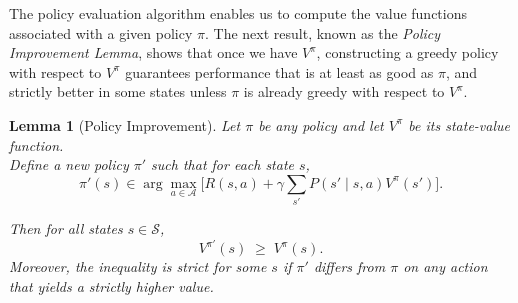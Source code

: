 \documentclass[
]{book}
\newtheorem{lemma}{Lemma}[chapter]
\theoremstyle{definition}
\theoremstyle{definition}
\theoremstyle{definition}
\theoremstyle{definition}
\theoremstyle{remark}
\begin{document}
The policy evaluation algorithm enables us to compute the value functions associated with a given policy \(\pi\). The next result, known as the \emph{Policy Improvement Lemma}, shows that once we have \(V^{\pi}\), constructing a greedy policy with respect to \(V^{\pi}\) guarantees performance that is at least as good as \(\pi\), and strictly better in some states unless \(\pi\) is already greedy with respect to \(V^{\pi}\).

\begin{lemma}[Policy Improvement]
\protect\hypertarget{lem:InfiniteHorizonPolicyImprovement}{}\label{lem:InfiniteHorizonPolicyImprovement}Let \(\pi\) be any policy and let \(V^{\pi}\) be its state-value function.\\
Define a new policy \(\pi'\) such that for each state \(s\),
\[
\pi'(s) \in \arg\max_{a \in \mathcal{A}}
\Big[ R(s,a) + \gamma \sum_{s'} P(s' \mid s,a) V^{\pi}(s') \Big].
\]

Then for all states \(s \in \mathcal{S}\),
\[
V^{\pi'}(s) \;\ge\; V^{\pi}(s).
\]
Moreover, the inequality is strict for some \(s\) if \(\pi'\) differs from \(\pi\) on any action that yields a strictly higher value.
\end{lemma}
\end{document}
